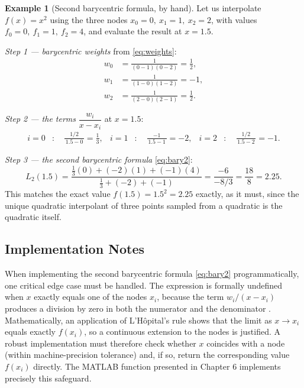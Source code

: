 \documentclass[12pt, a4paper]{article}
\theoremstyle{plain}
\theoremstyle{definition}
\newtheorem{example}[theorem]{Example}
\theoremstyle{remark}
\begin{document}
\begin{example}[Second barycentric formula, by hand]\label{ex:bary}
Let us interpolate $f(x) = x^2$ using the three nodes $x_0 = 0,\ x_1 = 1,\ x_2 = 2$, with values $f_0 = 0,\ f_1 = 1,\ f_2 = 4$, and evaluate the result at $x = 1.5$.

\medskip
\noindent\textit{Step 1 --- barycentric weights} from \eqref{eq:weights}:
\begin{align*}
    w_0 &= \frac{1}{(0 - 1)(0 - 2)} = \frac{1}{2}, \\
    w_1 &= \frac{1}{(1 - 0)(1 - 2)} = -1, \\
    w_2 &= \frac{1}{(2 - 0)(2 - 1)} = \frac{1}{2}.
\end{align*}

\noindent\textit{Step 2 --- the terms} $\dfrac{w_i}{x - x_i}$ at $x = 1.5$:
\begin{align*}
    i=0&: \quad \frac{1/2}{\,1.5 - 0\,} = \frac{1}{3}, &
    i=1&: \quad \frac{-1}{\,1.5 - 1\,} = -2, &
    i=2&: \quad \frac{1/2}{\,1.5 - 2\,} = -1 .
\end{align*}

\noindent\textit{Step 3 --- the second barycentric formula} \eqref{eq:bary2}:
\begin{equation*}
    L_2(1.5) = \frac{\frac{1}{3}(0) + (-2)(1) + (-1)(4)}{\frac{1}{3} + (-2) + (-1)}
             = \frac{-6}{-8/3} = \frac{18}{8} = 2.25 .
\end{equation*}
This matches the exact value $f(1.5) = 1.5^2 = 2.25$ exactly, as it must, since the unique quadratic interpolant of three points sampled from a quadratic is the quadratic itself.
\end{example}

\subsection{Implementation Notes}

When implementing the second barycentric formula \eqref{eq:bary2} programmatically, one critical edge case must be handled. The expression is formally undefined when $x$ exactly equals one of the nodes $x_i$, because the term $w_i/(x-x_i)$ produces a division by zero in both the numerator and the denominator \cite{micula4}. Mathematically, an application of L'H\^opital's rule shows that the limit as $x \to x_i$ equals exactly $f(x_i)$, so a continuous extension to the nodes is justified. A robust implementation must therefore check whether $x$ coincides with a node (within machine-precision tolerance) and, if so, return the corresponding value $f(x_i)$ directly. The MATLAB function presented in Chapter 6 implements precisely this safeguard.
\end{document}
